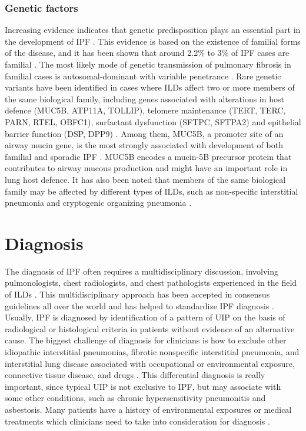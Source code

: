 \subsubsection{Genetic factors}
Increasing evidence indicates that genetic predisposition plays an essential part in the development of IPF \citep{xaubet2017idiopathic,richeldi2017idiopathic}. This evidence is based on the existence of familial forms of the disease, and it has been shown that around 2.2\% to 3\% of IPF cases are familial \citep{xaubet2017idiopathic}. The most likely mode of genetic transmission of pulmonary fibrosis in familial cases is autosomal-dominant with variable penetrance \citep{steele2005clinical,allam2006idiopathic,lee2005familial,musk1986genetic}. Rare genetic variants have been identified in cases where ILDs affect two or more members of the same biological family, including genes associated with alterations in host defence (MUC5B, ATP11A, TOLLIP), telomere maintenance (TERT, TERC, PARN, RTEL, OBFC1), surfactant dysfunction (SFTPC, SFTPA2) and epithelial barrier function (DSP, DPP9) \citep{alder2008short,raghu2011official,seibold2011common,xaubet2017idiopathic}. Among them, MUC5B, a promoter site of an airway mucin gene, is the most strongly associated with development of both familial and sporadic IPF \citep{richeldi2017idiopathic}. MUC5B encodes a mucin-5B precursor protein that contributes to airway mucous production and might have an important role in lung host defence. It has also been noted that members of the same biological family may be affected by different types of ILDs, such as non-specific interstitial pneumonia and cryptogenic organizing pneumonia \citep{xaubet2017idiopathic}.

\section{Diagnosis}
The diagnosis of IPF often requires a multidisciplinary discussion, involving pulmonologists, chest radiologists, and chest pathologists experienced in the field of ILDs \citep{flaherty2004idiopathic,king2011idiopathic,raghu2011official}. This multidisciplinary approach has been accepted in consensus guidelines all over the world and has helped to standardize IPF diagnosis \citep{raghu2011official,richeldi2017idiopathic}. Usually, IPF is diagnosed by identification of a pattern of UIP on the basis of radiological or histological criteria in patients without evidence of an alternative cause.  The biggest challenge of diagnosis for clinicians is how to exclude other idiopathic interstitial pneumonias, fibrotic nonspecific interstitial pneumonia, and interstitial lung disease associated with occupational or environmental exposure, connective tissue disease, and drugs \citep{king2011idiopathic,richeldi2017idiopathic}. This differential diagnosis is really important, since typical UIP is not exclusive to IPF, but may associate with some other conditions, such as chronic hypersensitivity pneumonitis and asbestosis. Many patients have a history of environmental exposures or medical treatments which clinicians need to take into consideration for diagnosis \citep{richeldi2017idiopathic}.

